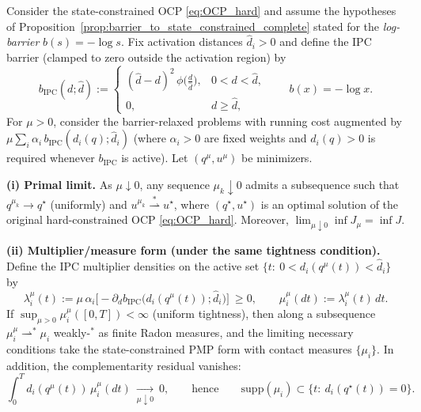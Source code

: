 \begin{corollary}
\label{cor:ipc_from_logbarrier}
Consider the state-constrained OCP \cref{eq:OCP_hard} and assume the hypotheses of
Proposition~\ref{prop:barrier_to_state_constrained_complete} stated for the \emph{log-barrier} $b(s)=-\log s$.
Fix activation distances $\hat d_i>0$ and define the IPC barrier (clamped to zero outside the activation region) by
\begin{equation}
\label{eq:ipc_barrier_def}
b_{\mathrm{IPC}}(d;\hat d)
:=
\begin{cases}
(\hat d-d)^2\,\phi\!\big(\frac{d}{\hat d}\big), & 0<d<\hat d,\\
0, & d\ge \hat d,
\end{cases}
\qquad b(x)=-\log x .
\end{equation}
For $\mu>0$, consider the barrier-relaxed problems with running cost augmented by
\(
\mu\sum_i \alpha_i\, b_{\mathrm{IPC}}(d_i(q);\hat d_i)
\)
(where $\alpha_i>0$ are fixed weights and $d_i(q)>0$ is required whenever $b_{\mathrm{IPC}}$ is active).
Let $(q^\mu,u^\mu)$ be minimizers.

\smallskip
\noindent\textbf{(i) Primal limit.}
As $\mu\downarrow 0$, any sequence $\mu_k\downarrow 0$ admits a subsequence such that
\(
q^{\mu_k}\to q^\star
\)
(uniformly) and
\(
u^{\mu_k}\overset{\ast}{\rightharpoonup} u^\star
\),
where $(q^\star,u^\star)$ is an optimal solution of the original hard-constrained OCP \cref{eq:OCP_hard}.
Moreover, $\lim_{\mu\downarrow 0}\inf J_\mu=\inf J$.

\smallskip
\noindent\textbf{(ii) Multiplier/measure form (under the same tightness condition).}
Define the IPC multiplier densities on the active set $\{t:\ 0<d_i(q^\mu(t))<\hat d_i\}$ by
\begin{equation}
\label{eq:ipc_lambda_density}
\lambda_i^\mu(t)
:=\mu\,\alpha_i\Big[-\partial_d b_{\mathrm{IPC}}\big(d_i(q^\mu(t));\hat d_i\big)\Big]\ \ge 0,
\qquad
\mu_i^\mu(dt):=\lambda_i^\mu(t)\,dt .
\end{equation}
If $\sup_{\mu>0}\mu_i^\mu([0,T])<\infty$ (uniform tightness), then along a subsequence
$\mu_i^\mu \rightharpoonup^\ast \mu_i$ weakly-$^\ast$ as finite Radon measures, and the limiting necessary conditions
take the state-constrained PMP form with contact measures $\{\mu_i\}$.
In addition, the complementarity residual vanishes:
\begin{equation}
\label{eq:ipc_comp_residual}
\int_0^T d_i(q^\mu(t))\,\mu_i^\mu(dt)\ \xrightarrow[\mu\downarrow 0]{}\ 0,
\qquad\text{hence}\qquad
\mathrm{supp}(\mu_i)\subset\{t:\ d_i(q^\star(t))=0\}.
\end{equation}
\end{corollary}

